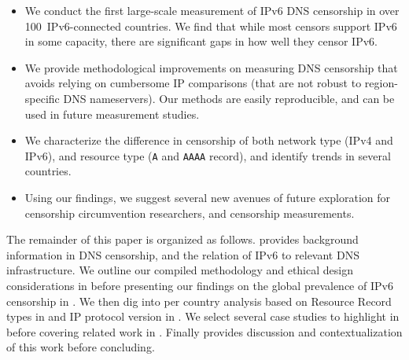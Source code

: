 \begin{itemize}
    \item
    We conduct the first large-scale measurement of IPv6 DNS censorship in over
    100~IPv6-connected countries. We find that while most censors support IPv6
    in some capacity, there are significant gaps in how well they censor IPv6.

    \item We provide methodological improvements on measuring DNS censorship
    that avoids relying on cumbersome IP comparisons (that are not
    robust to region-specific DNS nameservers). Our methods are easily
    reproducible, and can be used in future measurement studies.

    \item We characterize the difference in censorship of both network type
    (IPv4 and IPv6), and resource type ({\tt A} and {\tt AAAA} record), and
    identify trends in several countries.

    \item Using our findings, we suggest several new avenues of future
    exploration for censorship circumvention researchers, and censorship
    measurements.

\end{itemize}

The remainder of this paper is organized as follows.  provides
background information in DNS censorship, and the relation of IPv6 to relevant DNS
infrastructure. We outline our compiled methodology and ethical design
considerations in  before presenting our findings on the
global prevalence of IPv6 censorship in . We then dig into
per country analysis based on Resource Record types in  and
IP protocol version in . We select several case studies
to highlight in  before covering related work in
. Finally  provides discussion and
contextualization of this work before concluding.
\fi

